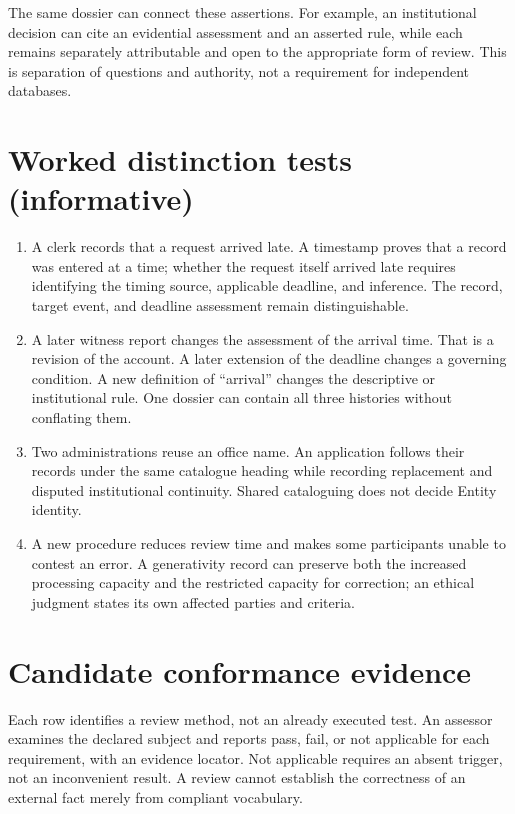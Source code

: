\documentclass[11pt,a4paper]{article}
\begin{document}

The same dossier can connect these assertions. For example, an institutional decision can cite an evidential assessment and an asserted rule, while each remains separately attributable and open to the appropriate form of review. This is separation of questions and authority, not a requirement for independent databases.

\section{Worked distinction tests (informative)}
\begin{enumerate}
\item A clerk records that a request arrived late. A timestamp proves that a record was entered at a time; whether the request itself arrived late requires identifying the timing source, applicable deadline, and inference. The record, target event, and deadline assessment remain distinguishable.
\item A later witness report changes the assessment of the arrival time. That is a revision of the account. A later extension of the deadline changes a governing condition. A new definition of ``arrival'' changes the descriptive or institutional rule. One dossier can contain all three histories without conflating them.
\item Two administrations reuse an office name. An application follows their records under the same catalogue heading while recording replacement and disputed institutional continuity. Shared cataloguing does not decide Entity identity.
\item A new procedure reduces review time and makes some participants unable to contest an error. A generativity record can preserve both the increased processing capacity and the restricted capacity for correction; an ethical judgment states its own affected parties and criteria.
\end{enumerate}

\section{Candidate conformance evidence}
Each row identifies a review method, not an already executed test. An assessor examines the declared subject and reports pass, fail, or not applicable for each requirement, with an evidence locator. Not applicable requires an absent trigger, not an inconvenient result. A review cannot establish the correctness of an external fact merely from compliant vocabulary.
\end{document}
